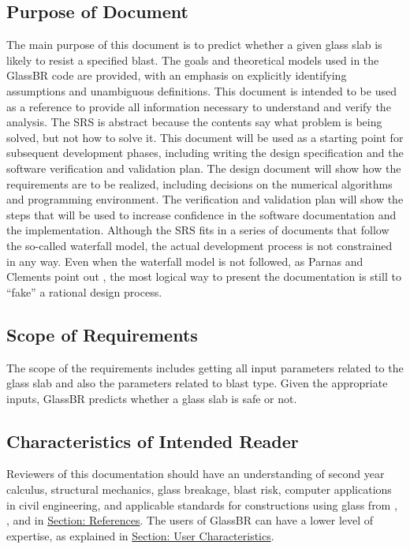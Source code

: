 \documentclass[12pt]{article}
\begin{document}
\subsection{Purpose of Document}
\label{Sec:DocPurpose}
The main purpose of this document is to predict whether a given glass slab is likely to resist a specified blast. The goals and theoretical models used in the GlassBR code are provided, with an emphasis on explicitly identifying assumptions and unambiguous definitions. This document is intended to be used as a reference to provide all information necessary to understand and verify the analysis. The SRS is abstract because the contents say what problem is being solved, but not how to solve it.
This document will be used as a starting point for subsequent development phases, including writing the design specification and the software verification and validation plan. The design document will show how the requirements are to be realized, including decisions on the numerical algorithms and programming environment. The verification and validation plan will show the steps that will be used to increase confidence in the software documentation and the implementation. Although the SRS fits in a series of documents that follow the so-called waterfall model, the actual development process is not constrained in any way. Even when the waterfall model is not followed, as Parnas and Clements point out \cite{parnasClements1986}, the most logical way to present the documentation is still to ``fake'' a rational design process.
\subsection{Scope of Requirements}
\label{Sec:ReqsScope}
The scope of the requirements includes getting all input parameters related to the glass slab and also the parameters related to blast type. Given the appropriate inputs, GlassBR predicts whether a glass slab is safe or not.
\subsection{Characteristics of Intended Reader}
\label{Sec:ReaderChars}
Reviewers of this documentation should have an understanding of second year calculus, structural mechanics, glass breakage, blast risk, computer applications in civil engineering, and applicable standards for constructions using glass from \cite{astm2009}, \cite{astm2012}, and \cite{astm2016} in \hyperref[Sec:References]{Section: References}. The users of GlassBR can have a lower level of expertise, as explained in \hyperref[Sec:UserChars]{Section: User Characteristics}.
\end{document}
